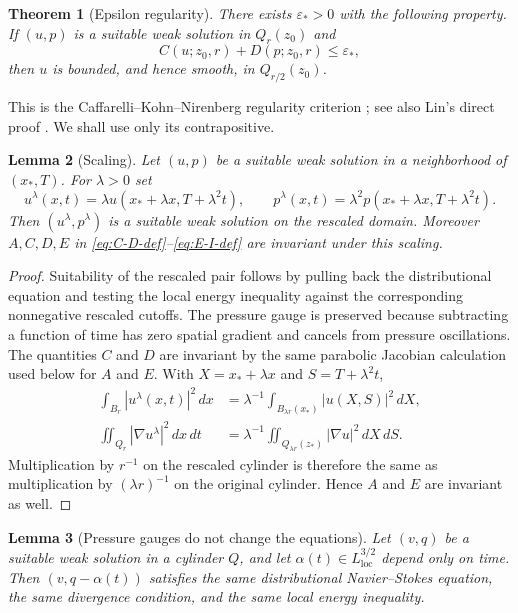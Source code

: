 \documentclass[11pt]{amsart}
\theoremstyle{plain}
\newtheorem{theorem}{Theorem}[section]
\newtheorem{lemma}[theorem]{Lemma}
\theoremstyle{definition}
\theoremstyle{remark}
\numberwithin{equation}{section}
\newcommand{\eps}{\varepsilon}
\begin{document}
\begin{theorem}[Epsilon regularity]\label{thm:eps-reg}
There exists \(\eps_*>0\) with the following property.  If \((u,p)\) is a
suitable weak solution in \(Q_r(z_0)\) and
\[
   C(u;z_0,r)+D(p;z_0,r)\le \eps_*,
\]
then \(u\) is bounded, and hence smooth, in \(Q_{r/2}(z_0)\).
\end{theorem}

This is the Caffarelli--Kohn--Nirenberg regularity criterion
\cite{CKN1982}; see also Lin's direct proof \cite{Lin1998}.  We shall use only
its contrapositive.

\begin{lemma}[Scaling]\label{lem:scaling}
Let \((u,p)\) be a suitable weak solution in a neighborhood of
\((x_*,T)\).  For \(\lambda>0\) set
\[
   u^\lambda(x,t)=\lambda u(x_*+\lambda x,T+\lambda^2t),
   \qquad
   p^\lambda(x,t)=\lambda^2 p(x_*+\lambda x,T+\lambda^2t).
\]
Then \((u^\lambda,p^\lambda)\) is a suitable weak solution on the rescaled
domain.  Moreover \(A,C,D,E\) in
\eqref{eq:C-D-def}--\eqref{eq:E-I-def} are invariant under
this scaling.
\end{lemma}

\begin{proof}
Suitability of the rescaled pair follows by pulling back the distributional
equation and testing the local energy inequality against the corresponding
nonnegative rescaled cutoffs.  The pressure gauge is preserved because
subtracting a function of time has zero spatial gradient and cancels from
pressure oscillations.  The quantities \(C\) and \(D\) are invariant by the
same parabolic Jacobian calculation used below for \(A\) and \(E\).  With
\(X=x_*+\lambda x\) and
\(S=T+\lambda^2t\),
\begin{align*}
   \int_{B_r}|u^\lambda(x,t)|^2\,dx
   &=
   \lambda^{-1}\int_{B_{\lambda r}(x_*)}|u(X,S)|^2\,dX,\\
   \iint_{Q_r}|\nabla u^\lambda|^2\,dx\,dt
   &=
   \lambda^{-1}\iint_{Q_{\lambda r}(z_*)}|\nabla u|^2\,dX\,dS .
\end{align*}
Multiplication by \(r^{-1}\) on the rescaled cylinder is therefore the same as
multiplication by \((\lambda r)^{-1}\) on the original cylinder.  Hence
\(A\) and \(E\) are invariant as well.
\end{proof}

\begin{lemma}[Pressure gauges do not change the equations]\label{lem:gauges-harmless}
Let \((v,q)\) be a suitable weak solution in a cylinder \(Q\), and let
\(\alpha(t)\in L^{3/2}_{\mathrm{loc}}\) depend only on time.  Then
\((v,q-\alpha(t))\) satisfies the same distributional Navier--Stokes equation,
the same divergence condition, and the same local energy inequality.
\end{lemma}
\end{document}
